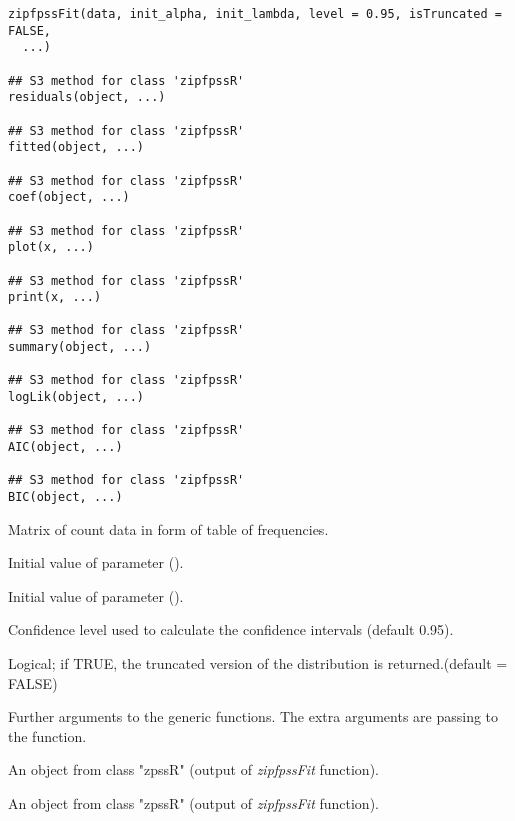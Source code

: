 \documentclass[letterpaper]{book}
\begin{document}
%
\begin{Usage}
\begin{verbatim}
zipfpssFit(data, init_alpha, init_lambda, level = 0.95, isTruncated = FALSE,
  ...)

## S3 method for class 'zipfpssR'
residuals(object, ...)

## S3 method for class 'zipfpssR'
fitted(object, ...)

## S3 method for class 'zipfpssR'
coef(object, ...)

## S3 method for class 'zipfpssR'
plot(x, ...)

## S3 method for class 'zipfpssR'
print(x, ...)

## S3 method for class 'zipfpssR'
summary(object, ...)

## S3 method for class 'zipfpssR'
logLik(object, ...)

## S3 method for class 'zipfpssR'
AIC(object, ...)

## S3 method for class 'zipfpssR'
BIC(object, ...)
\end{verbatim}
\end{Usage}
%
\begin{Arguments}
\begin{ldescription}
\item[\code{data}] Matrix of count data in form of table of frequencies.

\item[\code{init\_alpha}] Initial value of \eqn{\alpha}{} parameter ().

\item[\code{init\_lambda}] Initial value of \eqn{\lambda}{} parameter ().

\item[\code{level}] Confidence level used to calculate the confidence intervals (default 0.95).

\item[\code{isTruncated}] Logical; if TRUE, the truncated version of the distribution is returned.(default = FALSE)

\item[\code{...}] Further arguments to the generic functions. The extra arguments are passing
to the \emph{} function.

\item[\code{object}] An object from class "zpssR" (output of \emph{zipfpssFit} function).

\item[\code{x}] An object from class "zpssR" (output of \emph{zipfpssFit} function).
\end{ldescription}
\end{Arguments}
\end{document}
